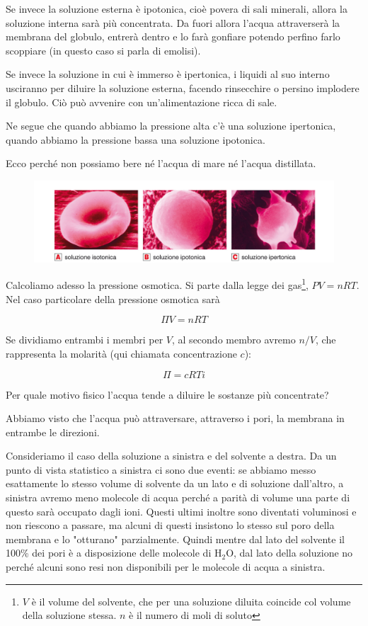 Se invece la soluzione esterna è ipotonica, cioè povera di sali minerali, allora la soluzione interna sarà più concentrata. Da fuori allora l'acqua attraverserà la membrana del globulo, entrerà dentro e lo farà gonfiare potendo perfino farlo scoppiare (in questo caso si parla di emolisi).
 
Se invece la soluzione in cui è immerso è ipertonica, i liquidi al suo interno usciranno per diluire la soluzione esterna, facendo rinsecchire o persino implodere il globulo. Ciò può avvenire con un'alimentazione ricca di sale.

Ne segue che quando abbiamo la pressione alta c'è una soluzione ipertonica, quando abbiamo la pressione bassa una soluzione ipotonica.

Ecco perché non possiamo bere né l'acqua di mare né l'acqua distillata.

\begin{figure}[htp]
    \centering
    \includegraphics[width=14cm]{immagini/sangue.png}
\end{figure}

Calcoliamo adesso la pressione osmotica.
Si parte dalla legge dei gas\footnote{$V$ è il volume del solvente, che per una soluzione diluita coincide col volume della soluzione stessa. $n$ è il numero di moli di soluto}, $PV=nRT$. Nel caso particolare della pressione osmotica sarà

$$\Pi V=nRT$$

Se dividiamo entrambi i membri per $V$, al secondo membro avremo $n/V$, che rappresenta la molarità (qui chiamata concentrazione $c$):

$$ \Pi = c R T i$$

Per quale motivo fisico l'acqua tende a diluire le sostanze più concentrate?

Abbiamo visto che l'acqua può attraversare, attraverso i pori, la membrana in entrambe le direzioni.

Consideriamo il caso della soluzione a sinistra e del solvente a destra. Da un punto di vista statistico a sinistra ci sono due eventi: se abbiamo messo esattamente lo stesso volume di solvente da un lato e di soluzione dall'altro, a sinistra avremo meno molecole di acqua perché a parità di volume una parte di questo sarà occupato dagli ioni. Questi ultimi inoltre sono diventati voluminosi e non riescono a passare, ma alcuni di questi insistono lo stesso sul poro della membrana e lo "otturano" parzialmente. Quindi mentre dal lato del solvente il 100\% dei pori è a disposizione delle molecole di H$_2$O, dal lato della soluzione no perché alcuni sono resi non disponibili per le molecole di acqua a sinistra.

